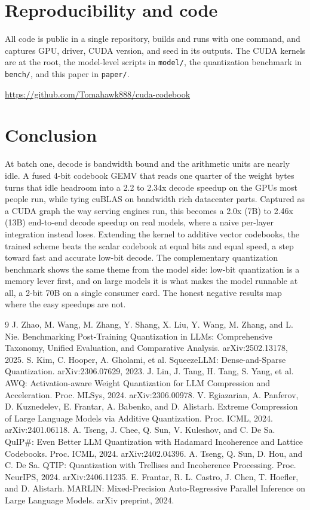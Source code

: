 \documentclass[11pt]{article}
\begin{document}
\section{Reproducibility and code}
All code is public in a single repository, builds and runs with one command, and
captures GPU, driver, CUDA version, and seed in its outputs. The CUDA kernels are at the
root, the model-level scripts in \texttt{model/}, the quantization benchmark in
\texttt{bench/}, and this paper in \texttt{paper/}.
\begin{center}
\url{https://github.com/Tomahawk888/cuda-codebook}
\end{center}

\section{Conclusion}
At batch one, decode is bandwidth bound and the arithmetic units are nearly idle.
A fused 4-bit codebook GEMV that reads one quarter of the weight bytes turns that
idle headroom into a 2.2 to 2.34x decode speedup on the GPUs most people run, while
tying cuBLAS on bandwidth rich datacenter parts. Captured as a CUDA graph the way
serving engines run, this becomes a 2.0x (7B) to 2.46x (13B) end-to-end decode
speedup on real models, where a naive per-layer integration instead loses. Extending
the kernel to additive vector codebooks, the trained scheme beats the scalar codebook
at equal bits and equal speed, a step toward fast and accurate low-bit decode. The
complementary quantization benchmark shows the same theme from the model side: low-bit
quantization is a memory lever first, and on large models it is what makes the model
runnable at all, a 2-bit 70B on a single consumer card. The honest negative results
map where the easy speedups are not.

\begin{thebibliography}{9}
 J. Zhao, M. Wang, M. Zhang, Y. Shang, X. Liu, Y. Wang, M. Zhang,
  and L. Nie. Benchmarking Post-Training Quantization in LLMs: Comprehensive
  Taxonomy, Unified Evaluation, and Comparative Analysis. arXiv:2502.13178, 2025.
 S. Kim, C. Hooper, A. Gholami, et al. SqueezeLLM:
  Dense-and-Sparse Quantization. arXiv:2306.07629, 2023.
 J. Lin, J. Tang, H. Tang, S. Yang, et al. AWQ: Activation-aware Weight
  Quantization for LLM Compression and Acceleration. Proc. MLSys, 2024.
  arXiv:2306.00978.
 V. Egiazarian, A. Panferov, D. Kuznedelev, E. Frantar, A. Babenko,
  and D. Alistarh. Extreme Compression of Large Language Models via Additive
  Quantization. Proc. ICML, 2024. arXiv:2401.06118.
 A. Tseng, J. Chee, Q. Sun, V. Kuleshov, and C. De Sa. QuIP\#:
  Even Better LLM Quantization with Hadamard Incoherence and Lattice Codebooks.
  Proc. ICML, 2024. arXiv:2402.04396.
 A. Tseng, Q. Sun, D. Hou, and C. De Sa. QTIP: Quantization with
  Trellises and Incoherence Processing. Proc. NeurIPS, 2024. arXiv:2406.11235.
 E. Frantar, R. L. Castro, J. Chen, T. Hoefler, and D. Alistarh.
  MARLIN: Mixed-Precision Auto-Regressive Parallel Inference on Large Language
  Models. arXiv preprint, 2024.
\end{thebibliography}
\end{document}

